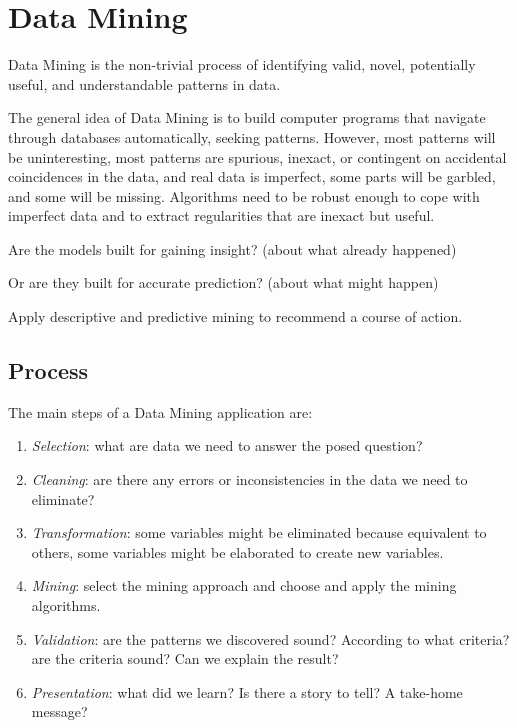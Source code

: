 \section{Data Mining}

\begin{definition}
    Data Mining is the non-trivial process of identifying valid, novel, potentially useful, and understandable patterns in data. 
\end{definition}
\noindent The general idea of Data Mining is to build computer programs that navigate through databases automatically, seeking patterns.
However, most patterns will be uninteresting, most patterns are spurious, inexact, or contingent on accidental coincidences in the data, and real data is imperfect, some parts will be garbled, and some will be missing.
Algorithms need to be robust enough to cope with imperfect data and to extract regularities that are inexact but useful.

\begin{definition}
    Are the models built for gaining insight? (about what already happened)
\end{definition}
\begin{definition}
    Or are they built for accurate prediction? (about what might happen)
\end{definition}
\begin{definition}
    Apply descriptive and predictive mining to recommend a course of action.
\end{definition}

\subsection{Process}
The main steps of a Data Mining application are: 
\begin{enumerate}
    \item \textit{Selection}: what are data we need to answer the posed question?
    \item \textit{Cleaning}: are there any errors or inconsistencies in the data we need to eliminate?
    \item \textit{Transformation}: some variables might be eliminated because equivalent to others, some variables might be elaborated to create new variables.
    \item \textit{Mining}: select the mining approach and choose and apply the mining algorithms.
    \item \textit{Validation}: are the patterns we discovered sound? According to what criteria? are the criteria sound? Can we explain the result?
    \item \textit{Presentation}: what did we learn? Is there a story to tell? A take-home message?
\end{enumerate}

